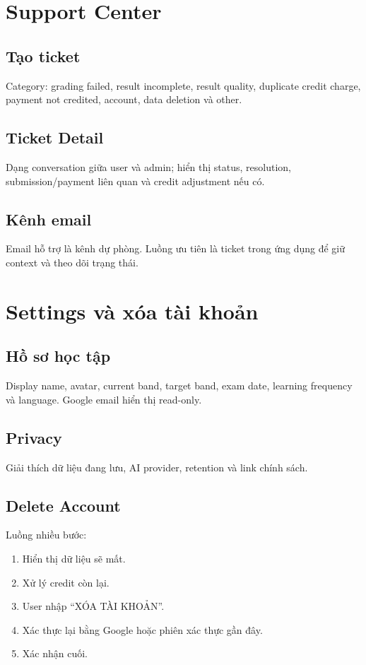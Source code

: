\documentclass[11pt,a4paper]{article}
\begin{document}
\section{Support Center}

\subsection{Tạo ticket}
Category: grading failed, result incomplete, result quality, duplicate credit charge, payment not credited, account, data deletion và other.

\subsection{Ticket Detail}
Dạng conversation giữa user và admin; hiển thị status, resolution, submission/payment liên quan và credit adjustment nếu có.

\subsection{Kênh email}
Email hỗ trợ là kênh dự phòng. Luồng ưu tiên là ticket trong ứng dụng để giữ context và theo dõi trạng thái.

\section{Settings và xóa tài khoản}

\subsection{Hồ sơ học tập}
Display name, avatar, current band, target band, exam date, learning frequency và language. Google email hiển thị read-only.

\subsection{Privacy}
Giải thích dữ liệu đang lưu, AI provider, retention và link chính sách.

\subsection{Delete Account}
Luồng nhiều bước:
\begin{enumerate}
  \item Hiển thị dữ liệu sẽ mất.
  \item Xử lý credit còn lại.
  \item User nhập ``XÓA TÀI KHOẢN''.
  \item Xác thực lại bằng Google hoặc phiên xác thực gần đây.
  \item Xác nhận cuối.
\end{enumerate}
\end{document}
